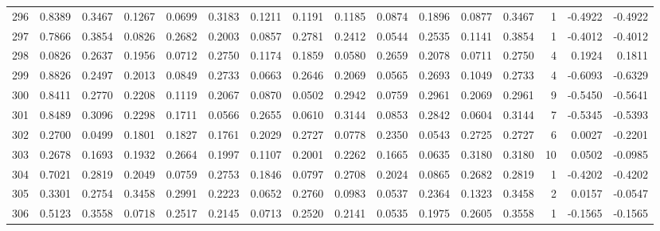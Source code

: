 \begin{tabular}{lrrrrrrrrrrrrrrr}
296 &      0.8389 &  0.3467 &  0.1267 &  0.0699 &  0.3183 &  0.1211 &  0.1191 &  0.1185 &  0.0874 &  0.1896 &   0.0877 &     0.3467 &      1 &                   -0.4922 &                    -0.4922 \\
297 &      0.7866 &  0.3854 &  0.0826 &  0.2682 &  0.2003 &  0.0857 &  0.2781 &  0.2412 &  0.0544 &  0.2535 &   0.1141 &     0.3854 &      1 &                   -0.4012 &                    -0.4012 \\
298 &      0.0826 &  0.2637 &  0.1956 &  0.0712 &  0.2750 &  0.1174 &  0.1859 &  0.0580 &  0.2659 &  0.2078 &   0.0711 &     0.2750 &      4 &                    0.1924 &                     0.1811 \\
299 &      0.8826 &  0.2497 &  0.2013 &  0.0849 &  0.2733 &  0.0663 &  0.2646 &  0.2069 &  0.0565 &  0.2693 &   0.1049 &     0.2733 &      4 &                   -0.6093 &                    -0.6329 \\
300 &      0.8411 &  0.2770 &  0.2208 &  0.1119 &  0.2067 &  0.0870 &  0.0502 &  0.2942 &  0.0759 &  0.2961 &   0.2069 &     0.2961 &      9 &                   -0.5450 &                    -0.5641 \\
301 &      0.8489 &  0.3096 &  0.2298 &  0.1711 &  0.0566 &  0.2655 &  0.0610 &  0.3144 &  0.0853 &  0.2842 &   0.0604 &     0.3144 &      7 &                   -0.5345 &                    -0.5393 \\
302 &      0.2700 &  0.0499 &  0.1801 &  0.1827 &  0.1761 &  0.2029 &  0.2727 &  0.0778 &  0.2350 &  0.0543 &   0.2725 &     0.2727 &      6 &                    0.0027 &                    -0.2201 \\
303 &      0.2678 &  0.1693 &  0.1932 &  0.2664 &  0.1997 &  0.1107 &  0.2001 &  0.2262 &  0.1665 &  0.0635 &   0.3180 &     0.3180 &     10 &                    0.0502 &                    -0.0985 \\
304 &      0.7021 &  0.2819 &  0.2049 &  0.0759 &  0.2753 &  0.1846 &  0.0797 &  0.2708 &  0.2024 &  0.0865 &   0.2682 &     0.2819 &      1 &                   -0.4202 &                    -0.4202 \\
305 &      0.3301 &  0.2754 &  0.3458 &  0.2991 &  0.2223 &  0.0652 &  0.2760 &  0.0983 &  0.0537 &  0.2364 &   0.1323 &     0.3458 &      2 &                    0.0157 &                    -0.0547 \\
306 &      0.5123 &  0.3558 &  0.0718 &  0.2517 &  0.2145 &  0.0713 &  0.2520 &  0.2141 &  0.0535 &  0.1975 &   0.2605 &     0.3558 &      1 &                   -0.1565 &                    -0.1565 \\

\end{tabular}
